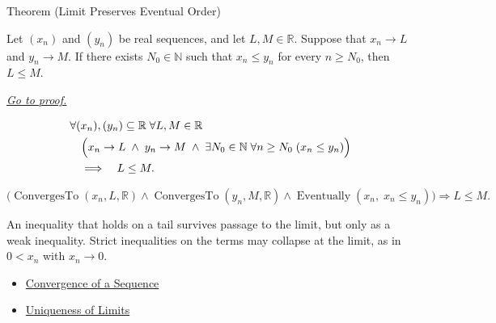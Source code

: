 \begin{theorembox}{Theorem (Limit Preserves Eventual Order)}
\begin{theorem}
\label{thm:limit-preserves-eventual-order}

Let $(x_n)$ and $(y_n)$ be real sequences, and let $L,M\in\mathbb{R}$.
Suppose that $x_n\to L$ and $y_n\to M$. If there exists
$N_0\in\mathbb{N}$ such that $x_n\le y_n$ for every $n\ge N_0$, then
$L\le M$.

\smallskip
\noindent
\hyperref[prf:limit-preserves-eventual-order]{\textit{Go to proof.}}
\end{theorem}
\end{theorembox}

\begin{remark*}
\[
\begin{aligned}
&\forall (x_n),(y_n)\subseteq\mathbb{R}\;\forall L,M\in\mathbb{R}\\
&\quad\Bigl(
  x_n\to L
  \;\land\;
  y_n\to M
  \;\land\;
  \exists N_0\in\mathbb{N}\;\forall n\ge N_0\;(x_n\le y_n)
\Bigr)\\
&\quad\Longrightarrow\quad L\le M.
\end{aligned}
\]
\end{remark*}

\begin{remark*}
\[
\bigl(
\operatorname{ConvergesTo}(x_n,L,\mathbb{R})
\land
\operatorname{ConvergesTo}(y_n,M,\mathbb{R})
\land
\operatorname{Eventually}(x_n,\;x_n\le y_n)
\bigr)
\Longrightarrow
L\le M.
\]
\end{remark*}

\begin{remark*}[Interpretation]
An inequality that holds on a tail survives passage to the limit, but only as
a weak inequality. Strict inequalities on the terms may collapse at the
limit, as in $0<x_n$ with $x_n\to 0$.
\end{remark*}

\begin{dependencies}
\begin{itemize}
  \item \hyperref[def:convergent-sequence]{Convergence of a Sequence}
  \item \hyperref[thm:uniqueness-of-limits]{Uniqueness of Limits}
\end{itemize}
\end{dependencies}


